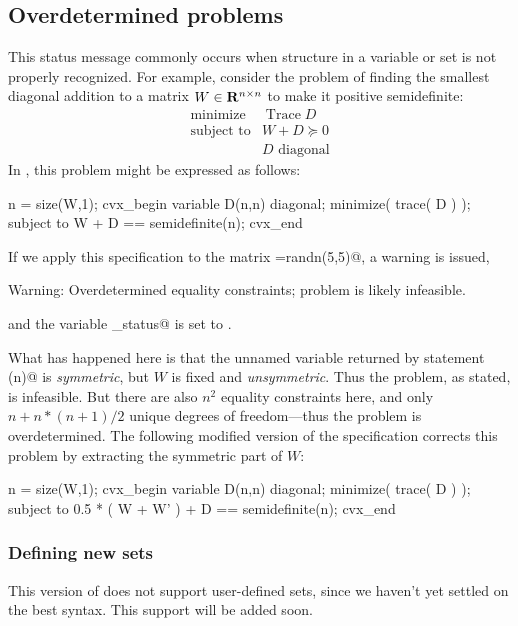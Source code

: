 \documentclass[12pt]{article}
\begin{document}
\subsection{Overdetermined problems}
\label{sec:overdetermined}

This status message \verb@Overdetermined@ commonly occurs when structure
in a variable or set is not properly recognized. For example, consider the problem
of finding the smallest diagonal addition to a matrix $W\in\mathbf{R}^{{n}\times{n}}$ to make it positive semidefinite:
\begin{equation}
	\begin{array}{ll}
		\text{minimize} & \mathop{\text{Trace}} D \\
		\text{subject to} & W + D \succeq 0 \\
		                  & D \text{~diagonal}
	\end{array}
\end{equation}
In \cvx, this problem might be expressed as follows:
\begin{code}
	n = size(W,1);
	cvx_begin
	    variable D(n,n) diagonal;
	    minimize( trace( D ) );
	    subject to
	        W + D == semidefinite(n);
	cvx_end
\end{code}
If we apply this specification to the matrix \verb@W=randn(5,5)@, a warning is issued,
\begin{code}
	Warning: Overdetermined equality constraints;
	    problem is likely infeasible.
\end{code}
and the variable \verb@cvx_status@ is set to \verb@Overdetermined@. 

What has happened here
is that the unnamed variable returned by statement \verb@semidefinite(n)@ is \emph{symmetric}, but
$W$ is fixed and \emph{unsymmetric}. Thus the problem, as stated, is infeasible. But
there are also $n^2$ equality constraints here, and only $n+n*(n+1)/2$ unique degrees
of freedom---thus the problem is overdetermined. The following modified 
version of the specification corrects this problem by extracting the symmetric part of $W$:
\begin{code}
	n = size(W,1);
	cvx_begin
	    variable D(n,n) diagonal;
	    minimize( trace( D ) );
	    subject to
	        0.5 * ( W + W' ) + D == semidefinite(n);
	cvx_end
\end{code}


\iffalse
\subsubsection{Defining new sets}
This version of \cvx does not support user-defined sets,
since we haven't yet settled on the best syntax.
This support will be added soon.
\end{document}
